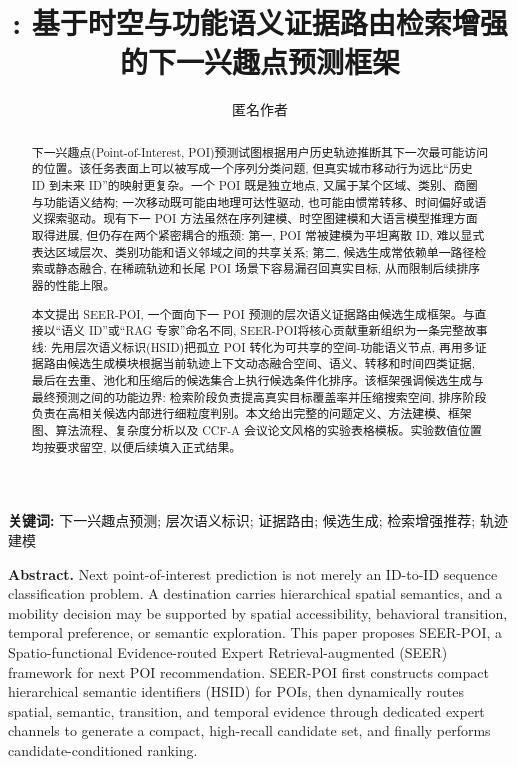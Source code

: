 \documentclass[10pt,twocolumn,fontset=none]{ctexart}
\title{\vspace{-1.0em}\bfseries \method: 基于时空与功能语义证据路由检索增强的下一兴趣点预测框架}
\author{匿名作者}
\date{}
\newcommand{\method}{SEER-POI}
\newcommand{\hsid}{HSID}
\begin{document}
\maketitle
\vspace{-1.35em}

\begin{abstract}
下一兴趣点(Point-of-Interest, POI)预测试图根据用户历史轨迹推断其下一次最可能访问的位置。该任务表面上可以被写成一个序列分类问题, 但真实城市移动行为远比“历史 ID 到未来 ID”的映射更复杂。一个 POI 既是独立地点, 又属于某个区域、类别、商圈与功能语义结构; 一次移动既可能由地理可达性驱动, 也可能由惯常转移、时间偏好或语义探索驱动。现有下一 POI 方法虽然在序列建模、时空图建模和大语言模型推理方面取得进展, 但仍存在两个紧密耦合的瓶颈: 第一, POI 常被建模为平坦离散 ID, 难以显式表达区域层次、类别功能和语义邻域之间的共享关系; 第二, 候选生成常依赖单一路径检索或静态融合, 在稀疏轨迹和长尾 POI 场景下容易漏召回真实目标, 从而限制后续排序器的性能上限。

本文提出 \method, 一个面向下一 POI 预测的层次语义证据路由候选生成框架。与直接以“语义 ID”或“RAG 专家”命名不同, \method 将核心贡献重新组织为一条完整故事线: 先用层次语义标识(\hsid)把孤立 POI 转化为可共享的空间-功能语义节点, 再用多证据路由候选生成模块根据当前轨迹上下文动态融合空间、语义、转移和时间四类证据, 最后在去重、池化和压缩后的候选集合上执行候选条件化排序。该框架强调候选生成与最终预测之间的功能边界: 检索阶段负责提高真实目标覆盖率并压缩搜索空间, 排序阶段负责在高相关候选内部进行细粒度判别。本文给出完整的问题定义、方法建模、框架图、算法流程、复杂度分析以及 CCF-A 会议论文风格的实验表格模板。实验数值位置均按要求留空, 以便后续填入正式结果。
\end{abstract}

\noindent\textbf{关键词:} 下一兴趣点预测; 层次语义标识; 证据路由; 候选生成; 检索增强推荐; 轨迹建模

\vspace{0.35em}
\noindent\textbf{Abstract.} Next point-of-interest prediction is not merely an ID-to-ID sequence classification problem. A destination carries hierarchical spatial semantics, and a mobility decision may be supported by spatial accessibility, behavioral transition, temporal preference, or semantic exploration. This paper proposes \method, a Spatio-functional Evidence-routed Expert Retrieval-augmented (SEER) framework for next POI recommendation. \method{} first constructs compact hierarchical semantic identifiers (HSID) for POIs, then dynamically routes spatial, semantic, transition, and temporal evidence through dedicated expert channels to generate a compact, high-recall candidate set, and finally performs candidate-conditioned ranking.
\end{document}
